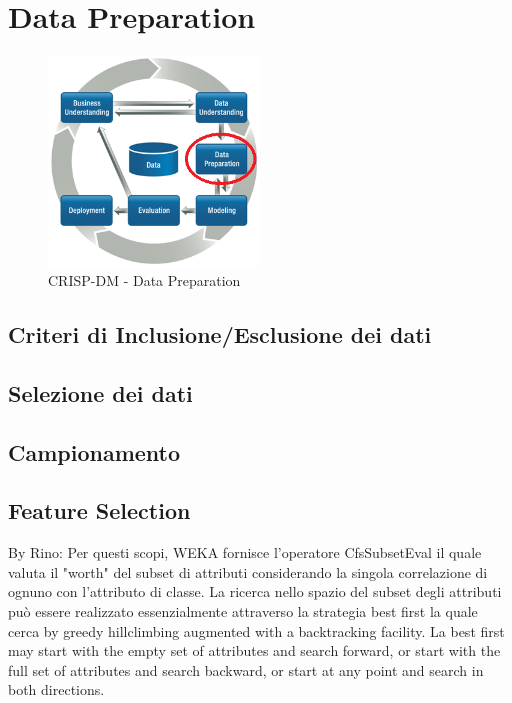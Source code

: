 \chapter{Data Preparation}

\begin{figure}[hbtp]
	\centering
	\includegraphics[width=0.5\textwidth]{./images/CRISPDM_3.png}
	\caption{CRISP-DM - Data Preparation}
	\label{CRISPDM_3}
\end{figure}



\section{Criteri di Inclusione/Esclusione dei dati}

\section{Selezione dei dati}

\section{Campionamento}


\section{Feature Selection}
By Rino:
Per questi scopi, WEKA fornisce l'operatore CfsSubsetEval il quale valuta il "worth" del subset di attributi considerando la singola correlazione di ognuno con l'attributo di classe. La ricerca nello spazio del subset degli attributi può essere realizzato essenzialmente attraverso la strategia best first la quale cerca by greedy hillclimbing augmented with a backtracking facility.
La best first may start with the empty set of attributes and search forward, or start with the full set of attributes and search backward, or start at any point and search in both directions.

